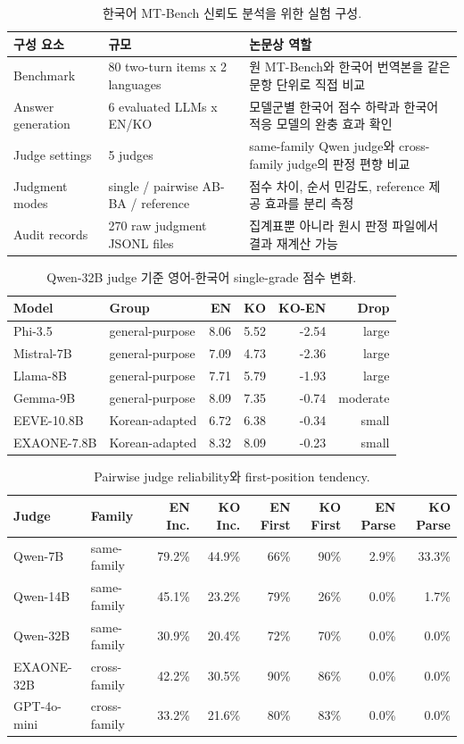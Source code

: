 
\begin{table}[t]
\centering
\caption{한국어 MT-Bench 신뢰도 분석을 위한 실험 구성.}
\label{tab:experimental-design}
\small
\begin{tabular}{llp{7.2cm}}
\toprule
구성 요소 & 규모 & 논문상 역할 \\
\midrule
Benchmark & 80 two-turn items x 2 languages & 원 MT-Bench와 한국어 번역본을 같은 문항 단위로 직접 비교 \\
Answer generation & 6 evaluated LLMs x EN/KO & 모델군별 한국어 점수 하락과 한국어 적응 모델의 완충 효과 확인 \\
Judge settings & 5 judges & same-family Qwen judge와 cross-family judge의 판정 편향 비교 \\
Judgment modes & single / pairwise AB-BA / reference & 점수 차이, 순서 민감도, reference 제공 효과를 분리 측정 \\
Audit records & 270 raw judgment JSONL files & 집계표뿐 아니라 원시 판정 파일에서 결과 재계산 가능 \\
\bottomrule
\end{tabular}
\end{table}
\begin{table}[t]
\centering
\caption{Qwen-32B judge 기준 영어-한국어 single-grade 점수 변화.}
\label{tab:qwen32-score-gap}
\small
\begin{tabular}{llrrrr}
\toprule
Model & Group & EN & KO & KO-EN & Drop \\
\midrule
Phi-3.5 & general-purpose & 8.06 & 5.52 & -2.54 & large \\
Mistral-7B & general-purpose & 7.09 & 4.73 & -2.36 & large \\
Llama-8B & general-purpose & 7.71 & 5.79 & -1.93 & large \\
Gemma-9B & general-purpose & 8.09 & 7.35 & -0.74 & moderate \\
EEVE-10.8B & Korean-adapted & 6.72 & 6.38 & -0.34 & small \\
EXAONE-7.8B & Korean-adapted & 8.32 & 8.09 & -0.23 & small \\
\bottomrule
\end{tabular}
\end{table}
\begin{table}[t]
\centering
\caption{Pairwise judge reliability와 first-position tendency.}
\label{tab:judge-reliability}
\small
\begin{tabular}{llrrrrrr}
\toprule
Judge & Family & EN Inc. & KO Inc. & EN First & KO First & EN Parse & KO Parse \\
\midrule
Qwen-7B & same-family & 79.2\% & 44.9\% & 66\% & 90\% & 2.9\% & 33.3\% \\
Qwen-14B & same-family & 45.1\% & 23.2\% & 79\% & 26\% & 0.0\% & 1.7\% \\
Qwen-32B & same-family & 30.9\% & 20.4\% & 72\% & 70\% & 0.0\% & 0.0\% \\
EXAONE-32B & cross-family & 42.2\% & 30.5\% & 90\% & 86\% & 0.0\% & 0.0\% \\
GPT-4o-mini & cross-family & 33.2\% & 21.6\% & 80\% & 83\% & 0.0\% & 0.0\% \\
\bottomrule
\end{tabular}
\end{table}
